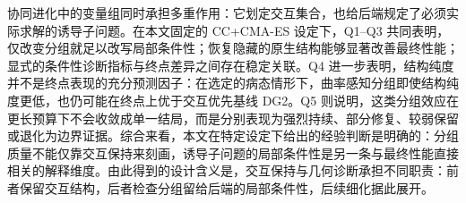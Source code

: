 协同进化中的变量组同时承担多重作用：它划定交互集合，也给后端规定了必须实际求解的诱导子问题。在本文固定的 CC+CMA-ES 设定下，Q1--Q3 共同表明，仅改变分组就足以改写局部条件性；恢复隐藏的原生结构能够显著改善最终性能；显式的条件性诊断指标与终点差异之间存在稳定关联。Q4 进一步表明，结构纯度并不是终点表现的充分预测因子：在选定的病态情形下，曲率感知分组即使结构纯度更低，也仍可能在终点上优于交互优先基线 DG2。Q5 则说明，这类分组效应在更长预算下不会收敛成单一结局，而是分别表现为强烈持续、部分修复、较弱保留或退化为边界证据。综合来看，本文在特定设定下给出的经验判断是明确的：分组质量不能仅靠交互保持来刻画，诱导子问题的局部条件性是另一条与最终性能直接相关的解释维度。由此得到的设计含义是，交互保持与几何诊断承担不同职责：前者保留交互结构，后者检查分组留给后端的局部条件性，后续细化据此展开。
